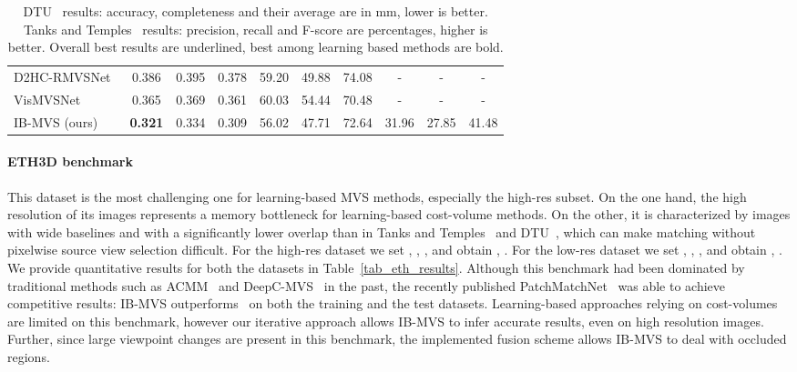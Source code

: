 \documentclass{bmvc2k}
\begin{document}
\begin{table}[t]
\begin{tabular}{@{}lccccccccc@{}}
    D2HC-RMVSNet~\cite{dhcrmvsnet} & 0.386 & 0.395 & 0.378 & 59.20 & 49.88 & 74.08 & - & - & - \\
    VisMVSNet~\cite{vismvsnet} & 0.365 & 0.369 & 0.361 & 60.03 & 54.44 & 70.48 & - & - & - \\ 
    IB-MVS (ours) & \textbf{0.321} & 0.334 & 0.309 & 56.02 & 47.71 & 72.64 & 31.96 & 27.85 & 41.48 \\
    \bottomrule
    \end{tabular}
    \caption{
    DTU~\cite{dtu} results: accuracy, completeness and their average are in mm, lower is better.
    Tanks and Temples~\cite{tanksandtemples} results: precision, recall and F-score are percentages, higher is better.
    Overall best results are underlined, best among learning based methods are bold.
    \vspace{-10pt}
    }
    \label{tab_dtu_tanks_results}
\end{table}
\paragraph{ETH3D benchmark~\cite{eth3d}}
This dataset is the most challenging one for learning-based MVS methods, especially the high-res subset.
On the one hand, the high resolution of its images represents a memory bottleneck for learning-based cost-volume methods.
On the other, it is characterized by images with wide baselines and with a significantly lower overlap than in Tanks and Temples~\cite{tanksandtemples} and DTU~\cite{dtu}, which can make matching without pixelwise source view selection difficult.
For the high-res dataset we set , , ,  and obtain , .
For the low-res dataset we set , , ,  and obtain , .
We provide quantitative results for both the datasets in Table~\ref{tab_eth_results}.
Although this benchmark had been dominated by traditional methods such as ACMM~\cite{acmm} and DeepC-MVS~\cite{deepcmvs} in the past, the recently published PatchMatchNet~\cite{patchmatchnet} was able to achieve competitive results: IB-MVS outperforms~\cite{patchmatchnet} on both the training and the test datasets. 
Learning-based approaches relying on cost-volumes are limited on this benchmark, however our iterative approach allows IB-MVS to infer accurate results, even on high resolution images. Further, since large viewpoint changes are present in this benchmark, the implemented fusion scheme allows IB-MVS to deal with occluded regions.
\end{document}
